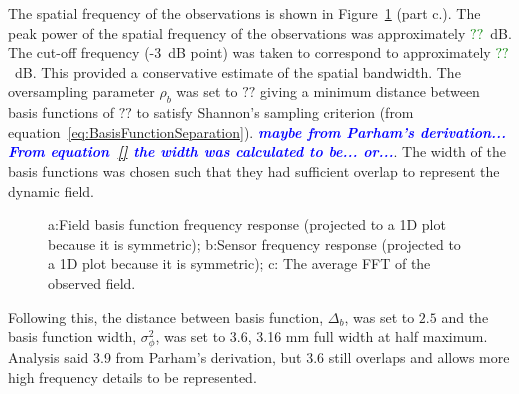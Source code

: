 \documentclass[12pt]{iopart}
\newcommand{\todo}[1]{\textsf{\emph{\textbf{\textcolor{blue}{#1}}}}}
\newcommand{\omg}[1]{\textsf{\emph{\textbf{\textcolor{green}{#1}}}}}
\begin{document}
The spatial frequency of the observations is shown in Figure~\ref{fig:FreqAnalysis} (part c.). The peak power of the spatial frequency of the observations was approximately \omg{$??$}~dB. The cut-off frequency (-3~dB point) was taken to correspond to  approximately \omg{$??$}~dB. This provided a conservative estimate of the spatial bandwidth. The oversampling parameter $\rho_b$ was set to $??$ giving a minimum distance between basis functions of $??$ to satisfy Shannon's sampling criterion (from equation~\ref{eq:BasisFunctionSeparation}). \todo{maybe from Parham's derivation... From equation~\ref{} the width was calculated to be... or...}. The width of the basis functions was chosen such that they had sufficient overlap to represent the dynamic field.

\begin{figure}
	\begin{center}
	\end{center}
	\caption{a:Field basis function frequency response (projected to a 1D plot because it is symmetric); b:Sensor frequency response (projected to a 1D plot because it is symmetric); c: The average FFT of the observed field.} 
\label{fig:FreqAnalysis} 
\end{figure}
Following this, the distance between basis function, $\Delta_b$, was set to $2.5$ and the basis function width, $\sigma_{\phi}^2$, was set to 3.6, 3.16 mm full width at half maximum. Analysis said 3.9 from Parham's derivation, but 3.6 still overlaps and allows more high frequency details to be represented.
\end{document}
